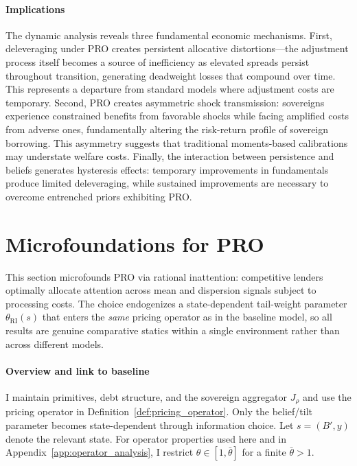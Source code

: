 \documentclass[12pt]{article}
\theoremstyle{plain}
\begin{document}
\paragraph{Implications}

The dynamic analysis reveals three fundamental economic mechanisms. First,
deleveraging under PRO creates persistent allocative distortions—the adjustment
process itself becomes a source of inefficiency as elevated spreads persist
throughout transition, generating deadweight losses that compound over time.
This represents a departure from standard models where adjustment costs are
temporary. Second, PRO creates asymmetric shock transmission: sovereigns
experience constrained benefits from favorable shocks while facing amplified
costs from adverse ones, fundamentally altering the risk-return profile of
sovereign borrowing. This asymmetry suggests that traditional moments-based
calibrations may understate welfare costs. Finally, the interaction between
persistence and beliefs generates hysteresis effects: temporary improvements in
fundamentals produce limited deleveraging, while sustained improvements are
necessary to overcome entrenched priors exhibiting PRO.

\section{Microfoundations for PRO}\label{sec:micro}

This section microfounds PRO via rational inattention: competitive lenders
optimally allocate attention across mean and dispersion signals subject to
processing costs. The choice endogenizes a state-dependent tail-weight
parameter $\theta_{\mathrm{RI}}(s)$ that enters the \emph{same} pricing
operator as in the baseline model, so all results are genuine comparative
statics within a single environment rather than across different models.

\paragraph{Overview and link to baseline}
I maintain primitives, debt structure, and the sovereign aggregator $J_\rho$
and use the pricing operator in Definition~\ref{def:pricing_operator}. Only the
belief/tilt parameter becomes state-dependent through information choice. Let
$s=(B',y)$ denote the relevant state. For operator properties used here and in
Appendix~\ref{app:operator_analysis}, I restrict $\theta\in[1,\bar\theta]$ for
a finite $\bar\theta>1$.
\end{document}
